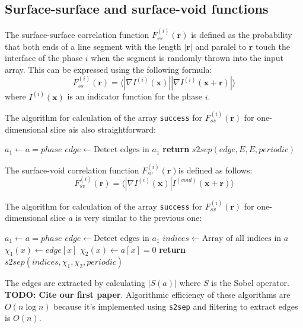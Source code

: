 \documentclass[reprint,amsmath,amssymb,aps,pre,nofootinbib]{revtex4-1}
\newcommand{\code}[1]{\colorbox{light-gray}{\texttt{#1}}}
\begin{document}
\subsection{Surface-surface and surface-void functions}
The surface-surface correlation function $F_{ss}^{(i)}(\bm{r})$ is defined as
the probability that both ends of a line segment with the length $|\bm{r}|$ and
paralel to $\bm{r}$ touch the interface of the phase $i$ when the segment is
randomly thrown into the input array. This can be expressed using the following
formula:
\begin{equation*}
  F_{ss}^{(i)}(\bm{r}) = \langle |\nabla I^{(i)}(\bm{x})| |\nabla I^{(i)}(\bm{x}
  + \bm{r})| \rangle
\end{equation*}
where $I^{(i)}(\bm{x})$ is an indicator function for the phase $i$.

The algorithm for calculation of the array \code{success} for
$F_{ss}^{(i)}(\bm{r})$ for one-dimensional slice $a$is also straightforward:
\begin{algorithmic}[1]
    \State $a_1 \gets a = phase$
    \State $edge \gets \text{Detect edges in $a_1$}$
    \State \textbf{return} $s2sep(edge, E, E, periodic)$
  \EndProcedure
\end{algorithmic}

The surface-void correlation function $F_{sv}^{(i)}(\bm{r})$is defined as
follows:
\begin{equation*}
  F_{sv}^{(i)}(\bm{r}) = \langle |\nabla I^{(i)}(\bm{x})| I^{(void)}(\bm{x}
  + \bm{r}) \rangle
\end{equation*}

The algorithm for calculation of the array \code{success} for
$F_{sv}^{(i)}(\bm{r})$ for one-dimensional slice $a$ is very similar to the
previous one:
\begin{algorithmic}[1]
    \State $a_1 \gets a = phase$
    \State $edge \gets \text{Detect edges in $a_1$}$
    \State $indices \gets \text{Array of all indices in $a$}$
    \State $\chi_1(x) \gets edge[x]$
    \State $\chi_2(x) \gets a[x] = 0$ 
    \State \textbf{return} $s2sep(indices, \chi_1, \chi_2, periodic)$
  \EndProcedure
\end{algorithmic}

The edges are extracted by calculating $|S(a)|$ where $S$ is the Sobel
operator. \textbf{TODO: Cite our first paper}. Algorithmic efficiency of these
algorithms are $O(n\log n)$ because it's implemented using \code{s2sep} and
filtering to extract edges is $O(n)$.
\end{document}
